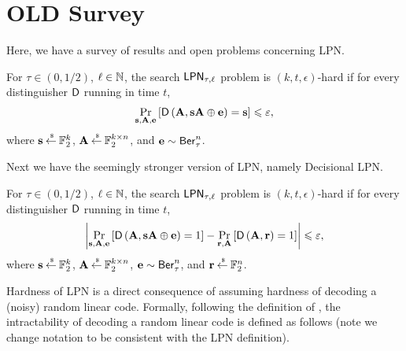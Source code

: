 \section{OLD Survey}
Here, we have a survey of results and open problems concerning LPN.

\begin{definition}\label{def:slpn}
	For $\tau \in (0,1/2)$, $\ell \in {\mathbb N}$, the search $\mathsf{LPN}_{\tau, \ell}$ problem is $(k, t, \epsilon)$-hard if for every distinguisher $\mathsf{D}$ running in time $t$,
	\begin{align*}
		\underset{\mathbf{s}, \mathbf{A}, \mathbf{e}}{\mathop{\mathrm{Pr}}}\left[\mathsf{D}\left(\mathbf{A}, {\mathbf s}{\mathbf A}\oplus\mathbf{e}\right)=\mathbf{s}\right] \leqslant \varepsilon,
	\end{align*}
	where $\mathbf{s} \mathbin{\stackrel{\mbox{\,\tiny \$}}{\gets}} {\mathbb F}^k_2$, $\mathbf{A} \mathbin{\stackrel{\mbox{\,\tiny \$}}{\gets}} {\mathbb F}^{k\times n}_2$, and $\mathbf{e} \sim \mathsf{Ber}^n_\tau$.
\end{definition}
Next we have the seemingly stronger version of LPN, namely Decisional LPN.
\begin{definition}\label{def:dlpn}
	For $\tau \in (0,1/2)$, $\ell \in {\mathbb N}$, the search $\mathsf{LPN}_{\tau, \ell}$ problem is $(k, t, \epsilon)$-hard if for every distinguisher $\mathsf{D}$ running in time $t$,
	\begin{align*}
	\abs{\underset{\vec{s}, \vec{A}, \vec{e}}{\pr}\left[\pred{D}\left(\vec{A}, \vec{sA}\xor\vec{e}\right) = 1\right] -
	\underset{\vec{r}, \vec{A}}{\pr}\left[\pred{D}\left(\vec{A}, \vec{r} \right)=1\right] } \leq \epsilon,
	\end{align*}
	where $\mathbf{s} \mathbin{\stackrel{\mbox{\,\tiny \$}}{\gets}} {\mathbb F}^k_2$, $\mathbf{A} \mathbin{\stackrel{\mbox{\,\tiny \$}}{\gets}} {\mathbb F}^{k\times n}_2$, $\mathbf{e} \sim \mathsf{Ber}^n_\tau$, and $\mathbf{r}\mathbin{\stackrel{\mbox{\,\tiny \$}}{\gets}}{\mathbb F}^n_2$.
\end{definition}

Hardness of LPN is a direct consequence of assuming hardness of decoding a (noisy) random linear code.
Formally, following the definition of \cite{applebaum2008fast}, the intractability of decoding a random linear code is defined as follows (note we change notation to be consistent with the LPN definition).

